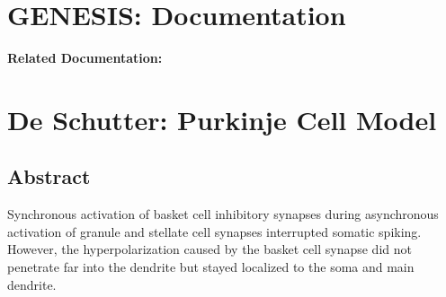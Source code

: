 \documentclass[12pt]{article}
\begin{document}
\section*{GENESIS: Documentation}

{\bf Related Documentation:}

\section*{De Schutter: Purkinje Cell Model}

\subsection*{Abstract}

Synchronous activation of basket cell inhibitory synapses
during asynchronous activation of granule and stellate cell synapses
interrupted somatic spiking. However, the hyperpolarization
caused by the basket cell synapse did not penetrate far into the
dendrite but stayed localized to the soma and main dendrite.
\end{document}
